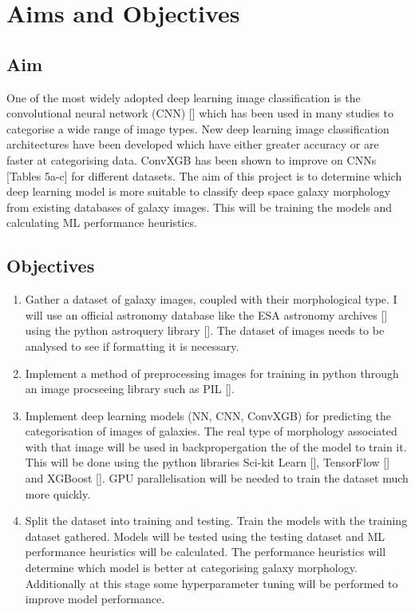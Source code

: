 \documentclass[runningheads]{llncs}
\begin{document}
\section{Aims and Objectives}

\subsection{Aim}
One of the most widely adopted deep learning image classification is the
convolutional neural network (CNN) [] which has been used in many studies to
categorise a wide range of image types. New deep learning image classification
architectures have been developed which have either greater accuracy or are
faster at categorising data. ConvXGB has been shown to improve on
CNNs [Tables 5a-c] for different datasets. The aim of this project is to
determine which deep learning model is more suitable to classify deep space
galaxy morphology from existing databases of galaxy images. This will be
training the models and calculating ML performance heuristics.

\subsection{Objectives}

\begin{enumerate}
    \item Gather a dataset of galaxy images, coupled with their morphological
    type. I will use an official astronomy database like the ESA astronomy
    archives [] using the python astroquery library []. The dataset of images
    needs to be analysed to see if formatting it is necessary.

    \item Implement a method of preprocessing images for training in python
    through an image procseeing library such as PIL [].

    \item Implement deep learning models (NN, CNN, ConvXGB) for predicting
    the categorisation of images of galaxies. The real type of morphology
    associated with that image will be used in backpropergation the of the model
    to train it. This will be done using the python libraries Sci-kit Learn [],
    TensorFlow [] and XGBoost []. GPU parallelisation will be needed to train
    the dataset much more quickly.

    \item Split the dataset into training and testing. Train the models with the
    training dataset gathered. Models will be tested using the testing dataset
    and ML performance heuristics will be calculated. The performance heuristics
    will determine which model is better at categorising galaxy morphology.
    Additionally at this stage some hyperparameter tuning will be performed to
    improve model performance.
\end{enumerate}
\end{document}
